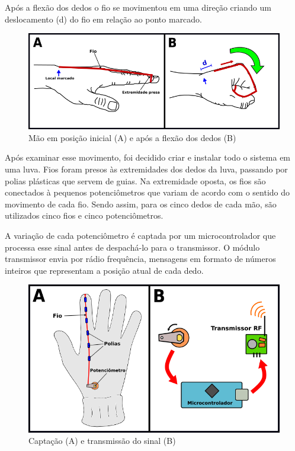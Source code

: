 \documentclass{ufpatcc}
\begin{document}
			Após a flexão dos dedos o fio se movimentou em uma direção criando um deslocamento (d) do fio em relação ao ponto marcado.


		\begin{figure}[h!]
  		\label{fig:hand-flex1}
			\centering
  		\includegraphics[scale=0.7]{../pictures/hand-flex1.png}
			\caption{Mão em posição inicial (A) e após a flexão dos dedos (B)}
		\end{figure}


			Após examinar esse movimento, foi decidido criar e instalar todo o sistema em uma luva. Fios foram presos às extremidades dos dedos da luva, passando por polias plásticas que servem de guias. Na extremidade oposta, os fios são conectados à pequenos potenciômetros que variam de acordo com o sentido do movimento de cada fio. Sendo assim, para os cinco dedos de cada mão, são utilizados cinco fios e cinco potenciômetros.

			A variação de cada potenciômetro é captada por um microcontrolador que processa esse sinal antes de despachá-lo para o transmissor. O módulo transmissor envia por rádio frequência, mensagens em formato de números inteiros que representam a posição atual de cada dedo.

		\begin{figure}[h!]
  		\label{fig:glove-and-transmitter1}
			\centering
  		\includegraphics[scale=0.7]{../pictures/glove-and-transmitter1.png}
			\caption{Captação (A) e transmissão do sinal (B)}
		\end{figure}
\end{document}
